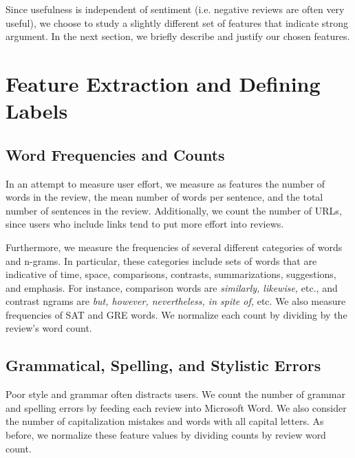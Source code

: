 \documentclass[letterpaper]{article}
\begin{document}
Since usefulness is independent of sentiment (i.e. negative reviews are often
very useful), we choose to study a slightly different set of features that
indicate strong argument. In the next section, we briefly describe and justify
our chosen features.

\section{Feature Extraction and Defining Labels}
\label{sec:features}

\subsection{Word Frequencies and Counts}
In an attempt to measure user effort, we measure as features the number of 
words in the review, the mean number of words per sentence, and the total 
number of sentences in the review. Additionally, we count the number of URLs, 
since users who include links tend to put more effort into reviews.

Furthermore, we measure the frequencies of several different categories of 
words and n-grams.  In particular, these categories include sets of words that
are indicative of time, space, comparisons, contrasts, summarizations,
suggestions, and emphasis.  For instance, comparison words are \emph{similarly,
likewise,} etc., and contrast ngrams are \emph{but, however, nevertheless, 
in spite of,} etc. We also measure frequencies of SAT and GRE words.  We 
normalize each count by dividing by the review's word count.

\subsection{Grammatical, Spelling, and Stylistic Errors}
Poor style and grammar often distracts users.  We count the number of grammar 
and spelling errors by feeding each review into Microsoft Word. We also 
consider the number of capitalization mistakes and words with all capital 
letters. As before, we normalize these feature values by dividing
counts by review word count.
\end{document}
